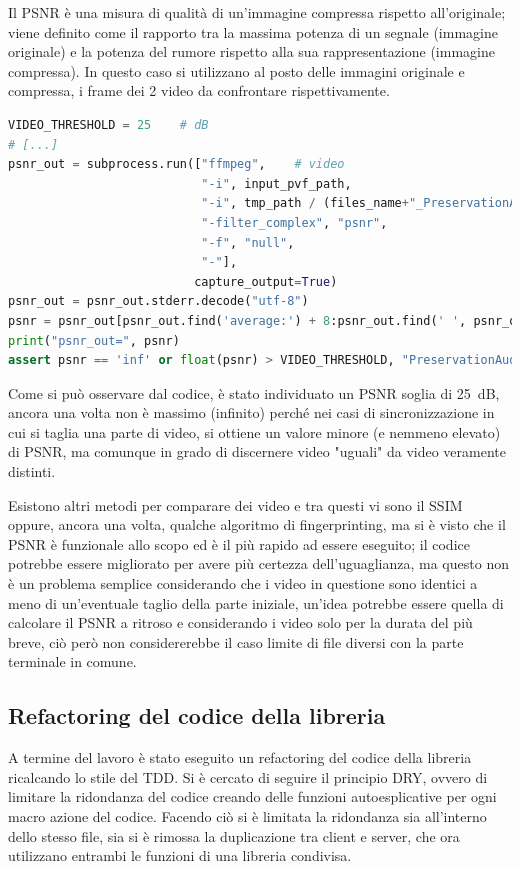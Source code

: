 Il \ac{PSNR} è una misura di qualità di un'immagine compressa rispetto all'originale; viene definito come il rapporto tra la massima potenza di un segnale (immagine originale) e la potenza del rumore rispetto alla sua rappresentazione (immagine compressa).
In questo caso si utilizzano al posto delle immagini originale e compressa, i frame dei 2 video da confrontare rispettivamente.

\begin{lstlisting}[language=Python, caption=Test di comparazione di due file audio tramite il PSNR]
VIDEO_THRESHOLD = 25    # dB
# [...]
psnr_out = subprocess.run(["ffmpeg",    # video
                           "-i", input_pvf_path,
                           "-i", tmp_path / (files_name+"_PreservationAudioVisualFile_output_video.mov"),
                           "-filter_complex", "psnr",
                           "-f", "null",
                           "-"],
                          capture_output=True)
psnr_out = psnr_out.stderr.decode("utf-8")
psnr = psnr_out[psnr_out.find('average:') + 8:psnr_out.find(' ', psnr_out.find('average:'))]
print("psnr_out=", psnr)
assert psnr == 'inf' or float(psnr) > VIDEO_THRESHOLD, "PreservationAudioVisualFile.mov is not the same as input"
\end{lstlisting}

Come si può osservare dal codice, è stato individuato un \ac{PSNR} soglia di \qty{25}{\dB}, ancora una volta non è massimo (infinito) perché nei casi di sincronizzazione in cui si taglia una parte di video, si ottiene un valore minore (e nemmeno elevato) di \ac{PSNR}, ma comunque in grado di discernere video "uguali" da video veramente distinti.

Esistono altri metodi per comparare dei video e tra questi vi sono il \ac{SSIM} oppure, ancora una volta, qualche algoritmo di fingerprinting, ma si è visto che il \ac{PSNR} è funzionale allo scopo ed è il più rapido ad essere eseguito; il codice potrebbe essere migliorato per avere più certezza dell'uguaglianza, ma questo non è un problema semplice considerando che i video in questione sono identici a meno di un'eventuale taglio della parte iniziale, un'idea potrebbe essere quella di calcolare il \ac{PSNR} a ritroso e considerando i video solo per la durata del più breve, ciò però non considererebbe il caso limite di file diversi con la parte terminale in comune.


\subsection{Refactoring del codice della libreria} \label{ssec:packager-post}  %
A termine del lavoro è stato eseguito un refactoring del codice della libreria ricalcando lo stile del \ac{TDD}.
Si è cercato di seguire il principio \ac{DRY}, ovvero di limitare la ridondanza del codice creando delle funzioni autoesplicative per ogni macro azione del codice.
Facendo ciò si è limitata la ridondanza sia all'interno dello stesso file, sia si è rimossa la duplicazione tra client e server, che ora utilizzano entrambi le funzioni di una libreria condivisa.

